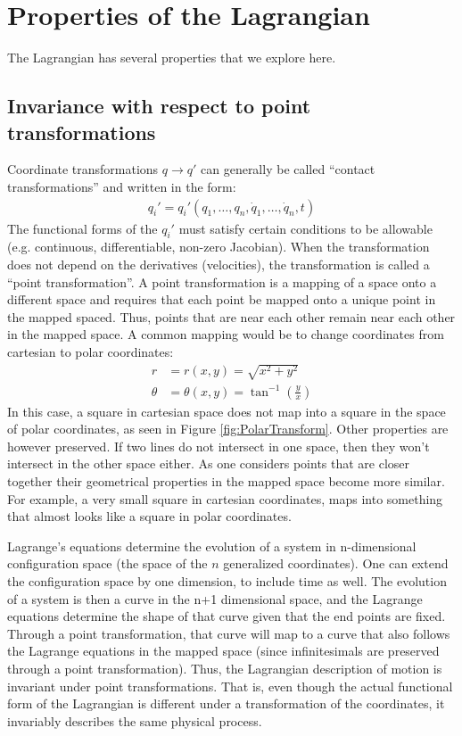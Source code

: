 \section{Properties of the Lagrangian}
The Lagrangian has several properties that we explore here.
\subsection{Invariance with respect to point transformations}
Coordinate transformations $q\to q'$ can generally be called ``contact transformations'' and written in the form:
\begin{align}
q_i'=q_i'(q_1,\dots , q_n, \dot{q}_1, \dots , \dot{q}_n, t)
\end{align}
The functional forms of the $q_i'$ must satisfy certain conditions to be allowable (e.g. continuous, differentiable, non-zero Jacobian). When the transformation does not depend on the derivatives (velocities), the transformation is called a ``point transformation''. A point transformation is a mapping of a space onto a different space and requires that each point be mapped onto a unique point in the mapped spaced. Thus, points that are near each other remain near each other in the mapped space. A common mapping would be to change coordinates from cartesian to polar coordinates:
\begin{align}
r&=r(x,y)=\sqrt{x^2+y^2}\nonumber\\
\theta &=\theta(x,y)=\tan^{-1}(\frac{y}{x})
\end{align}
In this case, a square in cartesian space does not map into a square in the space of polar coordinates, as seen in Figure \ref{fig:PolarTransform}. Other properties are however preserved. If two lines do not intersect in one space, then they won't intersect in the other space either. As one considers points that are closer together their geometrical properties in the mapped space become more similar. For example, a very small square in cartesian coordinates, maps into something that almost looks like a square in polar coordinates. 


Lagrange's equations determine the evolution of a system in n-dimensional configuration space (the space of the $n$ generalized coordinates). One can extend the configuration space by one dimension, to include time as well. The evolution of a system is then a curve in the n+1 dimensional space, and the Lagrange equations determine the shape of that curve given that the end points are fixed. Through a point transformation, that curve will map to a curve that also follows the Lagrange equations in the mapped space (since infinitesimals are preserved through a point transformation). Thus, the Lagrangian description of motion is invariant under point transformations. That is, even though the actual functional form of the Lagrangian is different under a transformation of the coordinates, it invariably describes the same physical process.

